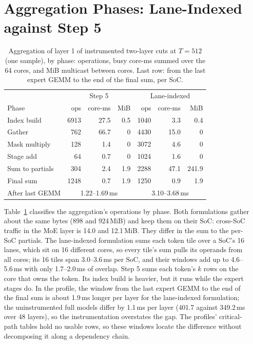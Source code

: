 \section{Aggregation Phases: Lane-Indexed against Step 5}
\label{app:phases}

\begin{table}[H]
\caption{Aggregation of layer 1 of instrumented two-layer cuts at $T=512$ (one sample), by phase: operations, busy
core-ms summed over the 64 cores, and MiB multicast between cores. Last row: from the last expert GEMM to the end of the
final sum, per SoC.}
\label{tab:phases}
\vskip 0.1in
\begin{center}
\begin{footnotesize}
\setlength{\tabcolsep}{2pt}
\begin{tabular}{@{}lrrrrrr@{}}
\toprule
 & \multicolumn{3}{c}{Step 5} & \multicolumn{3}{c}{Lane-indexed} \\
Phase & ops & core-ms & MiB & ops & core-ms & MiB \\
\midrule
Index build            & 6913 & 27.5 & 0.5 & 1040 & 3.3 & 0.4 \\
Gather                 & 762  & 66.7 & 0   & 4430 & 15.0 & 0 \\
Mask multiply          & 128  & 1.4  & 0   & 3072 & 4.6 & 0 \\
Stage add              & 64   & 0.7  & 0   & 1024 & 1.6 & 0 \\
Sum to partials        & 304 & 2.4  & 1.9 & 2288 & 47.1 & 241.9 \\
Final sum              & 1248 & 0.7  & 1.9 & 1250 & 0.9 & 1.9 \\
\midrule
After last GEMM        & \multicolumn{3}{c}{1.22--1.69\,ms} & \multicolumn{3}{c}{3.10--3.68\,ms} \\
\bottomrule
\end{tabular}
\end{footnotesize}
\end{center}
\vskip -0.15in
\end{table}

Table~\ref{tab:phases} classifies the aggregation's operations by phase. Both formulations gather about the same bytes
(898 and 924\,MiB) and keep them on their SoC: cross-SoC traffic in the MoE layer is 14.0 and 12.1\,MiB. They differ in
the sum to the per-SoC partials. The lane-indexed formulation sums each token tile over a SoC's 16 lanes, which sit on 16
different cores, so every tile's sum pulls its operands from all cores; its 16 tiles span 3.0--3.6\,ms per SoC, and their
windows add up to 4.6--5.6\,ms with only 1.7--2.0\,ms of overlap. Step 5 sums each token's $k$ rows on the core that owns
the token. Its index build is heavier, but it runs while the expert stages do. In the profile, the window from the last
expert GEMM to the end of the final sum is about 1.9\,ms longer per layer for the lane-indexed formulation; the
uninstrumented full models differ by 1.1\,ms per layer (401.7 against 349.2\,ms over 48 layers), so the instrumentation
overstates the gap. The profiles' critical-path tables hold no usable rows, so these windows locate the difference
without decomposing it along a dependency chain.
